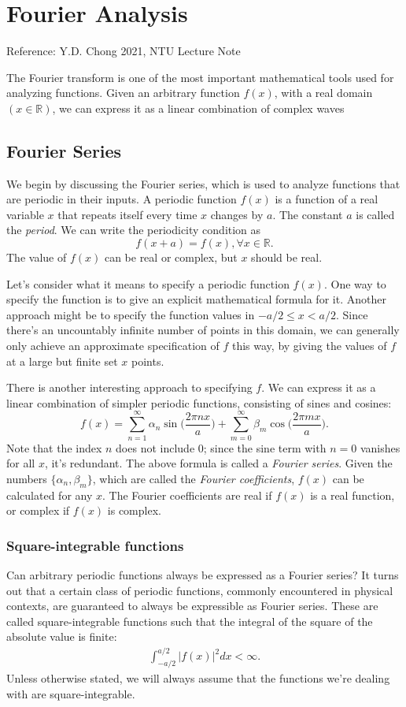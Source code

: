 \chapter{Fourier Analysis}
Reference: Y.D. Chong 2021, NTU Lecture Note

The Fourier transform is one of the most important mathematical tools used for analyzing functions. Given an arbitrary function $f(x)$, with a real domain $(x \in \mathbb{R})$, we can express it as a linear combination of complex waves

\section{Fourier Series}
\label{sec:fourier_series}

We begin by discussing the Fourier series, which is used to analyze functions that are periodic in their inputs. A periodic function $f(x)$ is a function of a real variable $x$ that repeats itself every time $x$ changes by $a$. The constant $a$ is called the \textit{period}. We can write the periodicity condition as
$$f(x+a) = f(x), \forall x\in \mathbb{R}.$$
The value of $f(x)$ can be real or complex, but $x$ should be real.

Let's consider what it means to specify a periodic function $f(x)$. One way to specify the function is to give an explicit mathematical formula for it. Another approach might be to specify the function values in $−a/2 \leq x < a/2$. Since there's an uncountably infinite number of points in this domain, we can generally only achieve an approximate specification of $f$ this way, by giving the values of $f$ at a large but finite set $x$ points. 

There is another interesting approach to specifying $f$. We can express it as a linear combination of simpler periodic functions, consisting of sines and cosines:
$$f(x) = \sum_{n=1}^{\infty} \alpha_n \sin\bigg(\frac{2\pi n x}{a}\bigg)+\sum_{m=0}^{\infty}\beta_m \cos\bigg(\frac{2\pi m x}{a}\bigg).$$
Note that the index $n$ does not include 0; since the sine term with $n = 0$ vanishes for all $x$, it's redundant. The above formula is called a \textit{Fourier series}. Given the numbers $\{\alpha_n, \beta_m\}$, which are called the \textit{Fourier coefficients}, $f(x)$ can be calculated for any $x$. The Fourier coefficients are real if $f(x)$ is a real function, or complex if $f(x)$ is complex.

\subsection{Square-integrable functions}
Can arbitrary periodic functions always be expressed as a Fourier series? It turns out that a certain class of periodic functions, commonly encountered in physical contexts, are guaranteed to always be expressible as Fourier series. These are called square-integrable functions such that the integral of the square of the absolute value is finite:
\begin{align*}
\int_{-a/2}^{a/2}|f(x)|^2 dx < \infty.
\end{align*}
Unless otherwise stated, we will always assume that the functions we're dealing with are square-integrable.

